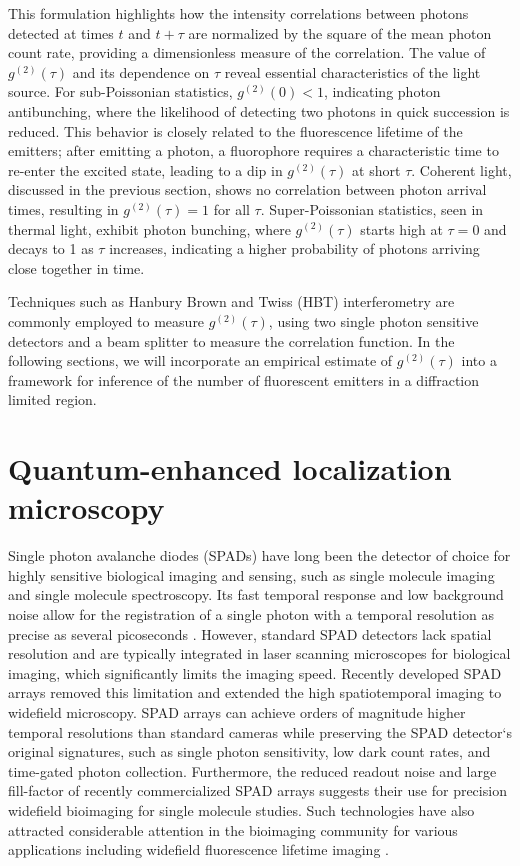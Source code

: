 This formulation highlights how the intensity correlations between photons detected at times $ t $ and $ t+\tau $ are normalized by the square of the mean photon count rate, providing a dimensionless measure of the correlation. The value of $ g^{(2)}(\tau) $ and its dependence on $ \tau $ reveal essential characteristics of the light source. For sub-Poissonian statistics, $ g^{(2)}(0) < 1$, indicating photon antibunching, where the likelihood of detecting two photons in quick succession is reduced. This behavior is closely related to the fluorescence lifetime of the emitters; after emitting a photon, a fluorophore requires a characteristic time to re-enter the excited state, leading to a dip in $ g^{(2)}(\tau) $ at short $ \tau $. Coherent light, discussed in the previous section, shows no correlation between photon arrival times, resulting in $ g^{(2)}(\tau) = 1 $ for all $ \tau $. Super-Poissonian statistics, seen in thermal light, exhibit photon bunching, where $ g^{(2)}(\tau) $ starts high at $ \tau = 0 $ and decays to 1 as $ \tau $ increases, indicating a higher probability of photons arriving close together in time.

Techniques such as Hanbury Brown and Twiss (HBT) interferometry are commonly employed to measure $ g^{(2)}(\tau) $, using two single photon sensitive detectors and a beam splitter to measure the correlation function. In the following sections, we will incorporate an empirical estimate of $g^{(2)}(\tau)$ into a framework for inference of the number of fluorescent emitters in a diffraction limited region. 

\section{Quantum-enhanced localization microscopy}

Single photon avalanche diodes (SPADs) have long been the detector of choice for highly sensitive biological imaging and sensing, such as single molecule imaging and single molecule spectroscopy. Its fast temporal response and low background noise allow for the registration of a single photon with a temporal resolution as precise as several picoseconds \parencite{Bruschini2019}. However, standard SPAD detectors lack spatial resolution and are typically integrated in laser scanning microscopes for biological imaging, which significantly limits the imaging speed. Recently developed SPAD arrays removed this limitation and extended the high spatiotemporal imaging to widefield microscopy. SPAD arrays can achieve orders of magnitude higher temporal resolutions than standard cameras while preserving the SPAD detector‘s original signatures, such as single photon sensitivity, low dark count rates, and time-gated photon collection. Furthermore, the reduced readout noise and large fill-factor of recently commercialized SPAD arrays suggests their use for precision widefield bioimaging for single molecule studies. Such technologies have also attracted considerable attention in the bioimaging community for various applications including widefield fluorescence lifetime imaging \parencite{Nedbal2024,Ulku2019,Zickus2020}.


